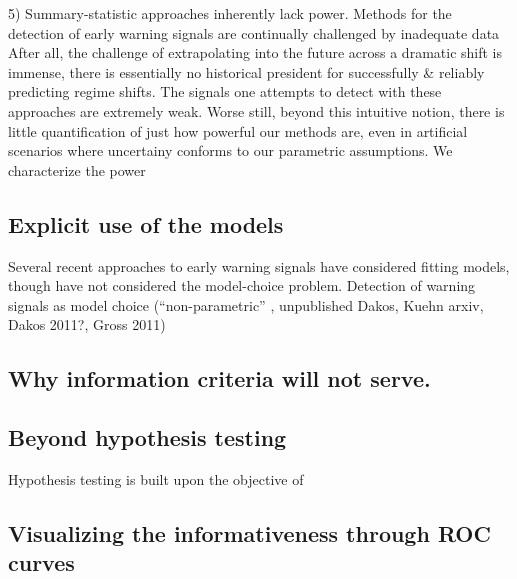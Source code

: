 \documentclass[authoryear,preprint,11pt]{elsarticle}
\begin{document}
5) Summary-statistic approaches inherently lack power. 
Methods for the detection of early warning signals are continually challenged by 
inadequate data  %
After all, the challenge of extrapolating into the future across a dramatic shift is immense,
there is essentially no historical president for successfully \& reliably predicting regime shifts. %
The signals one attempts to detect with these approaches are extremely weak.
Worse still, beyond this intuitive notion, there is little quantification of just how powerful our methods are,
even in artificial scenarios where uncertainy conforms to our parametric assumptions.  
We characterize the power



\subsection{Explicit use of the models}
Several recent approaches to early warning signals have considered fitting models, though have not considered the model-choice problem.  
Detection of warning signals as model choice (``non-parametric'' \citet{Carpenter2011e},  unpublished Dakos, Kuehn arxiv, Dakos 2011?, Gross 2011)


\subsection{Why information criteria will not serve.}


\subsection{Beyond hypothesis testing}
Hypothesis testing is built upon the objective of 

\citet{Seekell2011}

\subsection{Visualizing the informativeness through ROC curves}
\end{document}
